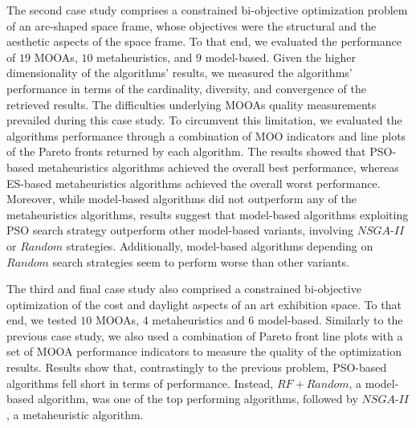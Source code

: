 The second case study comprises a constrained bi-objective optimization problem of an arc-shaped space frame, whose objectives were the structural and the aesthetic aspects of the space frame. To that end, we evaluated the performance of $19$ \acp{MOOA}, $10$ metaheuristics, and $9$ model-based. Given the higher dimensionality of the algorithms' results, we measured the algorithms' performance in terms of the cardinality, diversity, and convergence of the retrieved results. The difficulties underlying \acp{MOOA} quality measurements prevailed during this case study. To circumvent this limitation, we evaluated the algorithms performance through a combination of \ac{MOO} indicators and line plots of the Pareto fronts returned by each algorithm. The results showed that \ac{PSO}-based metaheuristics algorithms achieved the overall best performance, whereas \ac{ES}-based metaheuristics algorithms achieved the overall worst performance. Moreover, while model-based algorithms did not outperform any of the metaheuristics algorithms, results suggest that model-based algorithms exploiting \ac{PSO} search strategy outperform other model-based variants, involving $NSGA$-$II$ or $Random$ strategies. Additionally, model-based algorithms depending on $Random$ search strategies seem to perform worse than other variants. 

The third and final case study also comprised a constrained bi-objective optimization of the cost and daylight aspects of an art exhibition space. To that end, we tested $10$ \acp{MOOA}, $4$ metaheuristics and $6$ model-based. Similarly to the previous case study, we also used a combination of Pareto front line plots with a set of \ac{MOOA} performance indicators to measure the quality of the optimization results. Results show that, contrastingly to the previous problem, \ac{PSO}-based algorithms fell short in terms of performance. Instead, $RF+Random$, a model-based algorithm, was one of the top performing algorithms, followed by $NSGA$-$II$, a metaheuristic algorithm. 

